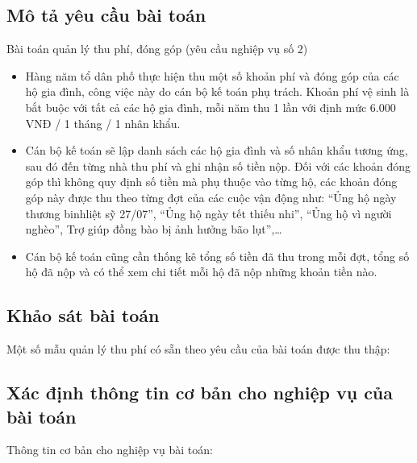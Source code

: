 \documentclass{article}
\begin{document}
\subsection{Mô tả yêu cầu bài toán}
Bài toán quản lý thu phí, đóng góp (yêu cầu nghiệp vụ số 2)
\begin{itemize}[leftmargin = 1.5cm]
    \item Hàng năm tổ dân phố thực hiện thu một số khoản phí và đóng góp của các hộ gia đình, công việc này do cán bộ kế toán phụ trách. Khoản phí vệ sinh là bắt buộc với tất cả các hộ gia đình, mỗi năm thu 1 lần với định mức 6.000 VNĐ / 1 tháng / 1 nhân khẩu.
    \item Cán bộ kế toán sẽ lập danh sách các hộ gia đình và số nhân khẩu tương ứng, sau đó đến từng nhà thu phí và ghi nhận số tiền nộp. Đối với các khoản đóng góp thì không quy định số tiền mà phụ thuộc vào từng hộ, các khoản đóng góp này được thu theo từng đợt của các cuộc vận động như: “Ủng hộ ngày thương binhliệt sỹ 27/07”, “Ủng hộ ngày tết thiếu nhi”, “Ủng hộ vì người nghèo”, Trợ giúp đồng bào bị ảnh hưởng bão lụt”,…
    \item Cán bộ kế toán cũng cần thống kê tổng số tiền đã thu trong mỗi đợt, tổng số hộ đã nộp và có thể xem chi tiết mỗi hộ đã nộp những khoản tiền nào.
\end{itemize}
\newpage


\subsection{Khảo sát bài toán}
Một số mẫu quản lý thu phí có sẵn theo yêu cầu của bài toán được thu thập:

\newpage


\subsection{Xác định thông tin cơ bản cho nghiệp vụ của bài toán}
Thông tin cơ bản cho nghiệp vụ bài toán:
\newpage

\end{document}
